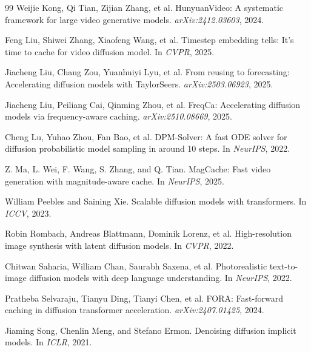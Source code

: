 \documentclass{article} %
\begin{document}
\begin{thebibliography}{99}
Weijie Kong, Qi Tian, Zijian Zhang, et al.
\newblock HunyuanVideo: A systematic framework for large video
  generative models.
\newblock \emph{arXiv:2412.03603}, 2024.

Feng Liu, Shiwei Zhang, Xiaofeng Wang, et al.
\newblock Timestep embedding tells: It's time to cache for video
  diffusion model.
\newblock In \emph{CVPR}, 2025.

Jiacheng Liu, Chang Zou, Yuanhuiyi Lyu, et al.
\newblock From reusing to forecasting: Accelerating diffusion models
  with TaylorSeers.
\newblock \emph{arXiv:2503.06923}, 2025.

Jiacheng Liu, Peiliang Cai, Qinming Zhou, et al.
\newblock FreqCa: Accelerating diffusion models via frequency-aware
  caching.
\newblock \emph{arXiv:2510.08669}, 2025.

Cheng Lu, Yuhao Zhou, Fan Bao, et al.
\newblock DPM-Solver: A fast ODE solver for diffusion probabilistic
  model sampling in around 10 steps.
\newblock In \emph{NeurIPS}, 2022.

Z. Ma, L. Wei, F. Wang, S. Zhang, and Q. Tian.
\newblock MagCache: Fast video generation with magnitude-aware cache.
\newblock In \emph{NeurIPS}, 2025.

William Peebles and Saining Xie.
\newblock Scalable diffusion models with transformers.
\newblock In \emph{ICCV}, 2023.

Robin Rombach, Andreas Blattmann, Dominik Lorenz, et al.
\newblock High-resolution image synthesis with latent diffusion models.
\newblock In \emph{CVPR}, 2022.

Chitwan Saharia, William Chan, Saurabh Saxena, et al.
\newblock Photorealistic text-to-image diffusion models with deep
  language understanding.
\newblock In \emph{NeurIPS}, 2022.

Pratheba Selvaraju, Tianyu Ding, Tianyi Chen, et al.
\newblock FORA: Fast-forward caching in diffusion transformer
  acceleration.
\newblock \emph{arXiv:2407.01425}, 2024.

Jiaming Song, Chenlin Meng, and Stefano Ermon.
\newblock Denoising diffusion implicit models.
\newblock In \emph{ICLR}, 2021.


\end{thebibliography}
\end{document}

